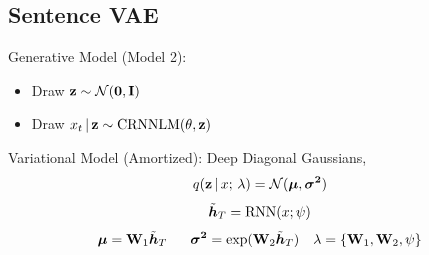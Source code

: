 
\subsection{Sentence VAE}
\begin{frame}
Generative Model (Model 2):
\begin{itemize}
    \item Draw $\mathbf{z} \sim \mathcal{N}(\mathbf{0}, \mathbf{I})$
    \item Draw $x_{t} \,|\,  \mathbf{z} \sim \operatorname*{CRNNLM}( \theta, \mathbf{z})$

\end{itemize}

Variational Model (Amortized): Deep Diagonal Gaussians, 
\[ q(\mathbf{z} \,|\, x ; \, \lambda ) = \mathcal{N}(\boldsymbol{\mu}, \boldsymbol{\sigma^2}) \]
\[ \tilde{\boldsymbol{h}}_T = \operatorname*{RNN}(x; \psi) \]
\[ \boldsymbol{\mu} = \mathbf{W}_1\tilde{\boldsymbol{h}}_T \,\,\,\,\,\,\,\,\,\, \boldsymbol{\sigma^2} = \exp(\mathbf{W}_2 \tilde{\boldsymbol{h}}_T)\ \ \ \lambda = \{\mathbf{W}_1, \mathbf{W}_2, \psi\}\]
\end{frame}


